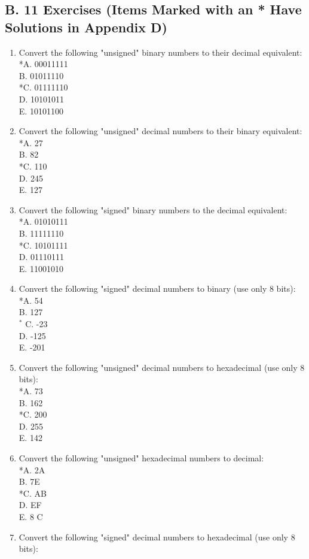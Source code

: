 \documentclass[10pt]{book}
\begin{document}
\begin{center}
\begin{center}
\begin{center}
\begin{center}
\begin{center}
\section*{B. 11 Exercises (Items Marked with an * Have Solutions in Appendix D)}
\begin{enumerate}
  \item Convert the following "unsigned" binary numbers to their decimal equivalent:\\
*A. 00011111\\
B. 01011110\\
*C. 01111110\\
D. 10101011\\
E. 10101100
  \item Convert the following "unsigned" decimal numbers to their binary equivalent:\\
*A. 27\\
B. 82\\
*C. 110\\
D. 245\\
E. 127
  \item Convert the following "signed" binary numbers to the decimal equivalent:\\
*A. 01010111\\
B. 11111110\\
*C. 10101111\\
D. 01110111\\
E. 11001010
  \item Convert the following "signed" decimal numbers to binary (use only 8 bits):\\
*A. 54\\
B. 127\\
${ }^{*}$ C. -23\\
D. -125\\
E. -201
  \item Convert the following "unsigned" decimal numbers to hexadecimal (use only 8 bits):\\
*A. 73\\
B. 162\\
*C. 200\\
D. 255\\
E. 142
  \item Convert the following "unsigned" hexadecimal numbers to decimal:\\
*A. 2A\\
B. 7E\\
*C. AB\\
D. EF\\
E. 8 C
  \item Convert the following "signed" decimal numbers to hexadecimal (use only 8 bits):\\

\end{enumerate}
\end{center}
\end{center}
\end{center}
\end{center}
\end{center}
\end{document}
